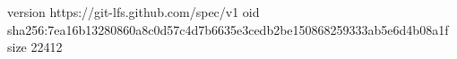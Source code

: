 version https://git-lfs.github.com/spec/v1
oid sha256:7ea16b13280860a8c0d57c4d7b6635e3cedb2be150868259333ab5e6d4b08a1f
size 22412
